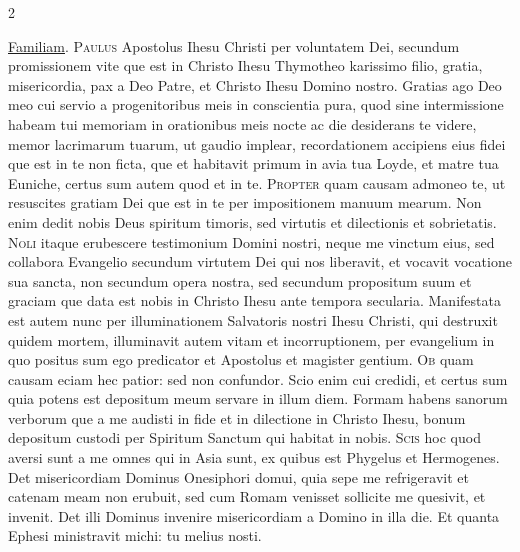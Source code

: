 \begin{multicols*}{2}
\par {} \hyperlink{familiam-tuam-dominica-quarta-post-octavas-epyphanie}{Familiam}.
\lettrine[lines=2]{\zallmancaps \color{Red} P}{aulus} Apostolus Ihesu Christi per voluntatem Dei, secundum promissionem vite que est in Christo Ihesu Thymotheo karissimo filio, gratia, misericordia, pax a Deo Patre, et Christo Ihesu Domino nostro. Gratias ago Deo meo cui servio a progenitoribus meis in conscientia pura, quod sine intermissione habeam tui memoriam in orationibus meis nocte ac die desiderans te videre, memor lacrimarum tuarum, ut gaudio implear, recordationem accipiens eius fidei que est in te non ficta, que et habitavit primum in avia tua Loyde, et matre tua Euniche, certus sum autem quod et in te.
\lettrine[lines=2]{\zallmancaps \color{Blue} P}{ropter} quam causam admoneo te, ut resuscites gratiam Dei que est in te per impositionem manuum mearum. Non enim dedit nobis Deus spiritum timoris, sed virtutis et dilectionis et sobrietatis.
\lettrine[lines=2]{\zallmancaps \color{Red} N}{oli} itaque erubescere testimonium Domini nostri, neque me vinctum eius, sed collabora Evangelio secundum virtutem Dei qui nos liberavit, et vocavit vocatione sua sancta, non secundum opera nostra, sed secundum propositum suum et graciam que data est nobis in Christo Ihesu ante tempora secularia. Manifestata est autem nunc per illuminationem Salvatoris nostri Ihesu Christi, qui destruxit quidem mortem, illuminavit autem vitam et incorruptionem, per evangelium in quo positus sum ego predicator et Apostolus et magister gentium.
\lettrine[lines=2]{\zallmancaps \color{Blue} O}{b} quam causam eciam hec patior: sed non confundor. Scio enim cui credidi, et certus sum quia potens est depositum meum servare in illum diem. Formam habens sanorum verborum que a me audisti in fide et in dilectione in Christo Ihesu, bonum depositum custodi per Spiritum Sanctum qui habitat in nobis.
\lettrine[lines=2]{\zallmancaps \color{Red} S}{cis} hoc quod aversi sunt a me omnes qui in Asia sunt, ex quibus est Phygelus et Hermogenes. Det misericordiam Dominus Onesiphori domui, quia sepe me refrigeravit et catenam meam non erubuit, sed cum Romam venisset sollicite me quesivit, et invenit. Det illi Dominus invenire misericordiam a Domino in illa die. Et quanta Ephesi ministravit michi: tu melius nosti.

\end{multicols*}
